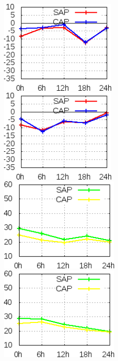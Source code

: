 \begin{figure}[!hbp]
\centering
\includegraphics[height=4.7cm]{./figs/VIES500zgeo0Z.png}\vspace{1.0cm}\hspace{1.0cm}\includegraphics[height=4.7cm]{./figs/VIES500zgeo12Z.png}
\includegraphics[height=4.7cm]{./figs/EQM500zgeo0Z.png}\vspace{1.0cm}\hspace{1.0cm}\includegraphics[height=4.7cm]{./figs/EQM500zgeo12Z.png}

\end{figure}
